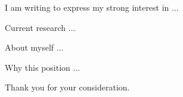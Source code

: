 
I am writing to express my strong interest in ...

\begin{point}{Current research}
  ...
\end{point}

\begin{point}{About myself}
  ...
\end{point}

\begin{point}{Why this position}
  ...
\end{point}

Thank you for your consideration.
